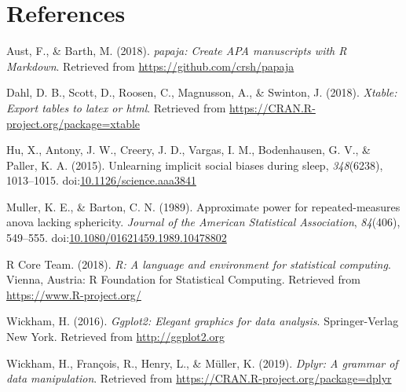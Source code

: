 \documentclass[man,floatsintext]{apa6}
\begin{document}
\newpage

\section{References}\label{references}

\begingroup
\setlength{\parindent}{-0.5in} \setlength{\leftskip}{0.5in}

\hypertarget{refs}{}
\hypertarget{ref-R-papaja}{}
Aust, F., \& Barth, M. (2018). \emph{papaja: Create APA manuscripts with
R Markdown}. Retrieved from \url{https://github.com/crsh/papaja}

\hypertarget{ref-R-xtable}{}
Dahl, D. B., Scott, D., Roosen, C., Magnusson, A., \& Swinton, J.
(2018). \emph{Xtable: Export tables to latex or html}. Retrieved from
\url{https://CRAN.R-project.org/package=xtable}

\hypertarget{ref-Hu1013}{}
Hu, X., Antony, J. W., Creery, J. D., Vargas, I. M., Bodenhausen, G. V.,
\& Paller, K. A. (2015). Unlearning implicit social biases during sleep,
\emph{348}(6238), 1013--1015.
doi:\href{https://doi.org/10.1126/science.aaa3841}{10.1126/science.aaa3841}

\hypertarget{ref-Keith1989}{}
Muller, K. E., \& Barton, C. N. (1989). Approximate power for
repeated-measures anova lacking sphericity. \emph{Journal of the
American Statistical Association}, \emph{84}(406), 549--555.
doi:\href{https://doi.org/10.1080/01621459.1989.10478802}{10.1080/01621459.1989.10478802}

\hypertarget{ref-R-base}{}
R Core Team. (2018). \emph{R: A language and environment for statistical
computing}. Vienna, Austria: R Foundation for Statistical Computing.
Retrieved from \url{https://www.R-project.org/}

\hypertarget{ref-R-ggplot2}{}
Wickham, H. (2016). \emph{Ggplot2: Elegant graphics for data analysis}.
Springer-Verlag New York. Retrieved from \url{http://ggplot2.org}

\hypertarget{ref-R-dplyr}{}
Wickham, H., François, R., Henry, L., \& Müller, K. (2019). \emph{Dplyr:
A grammar of data manipulation}. Retrieved from
\url{https://CRAN.R-project.org/package=dplyr}

\endgroup
\end{document}
